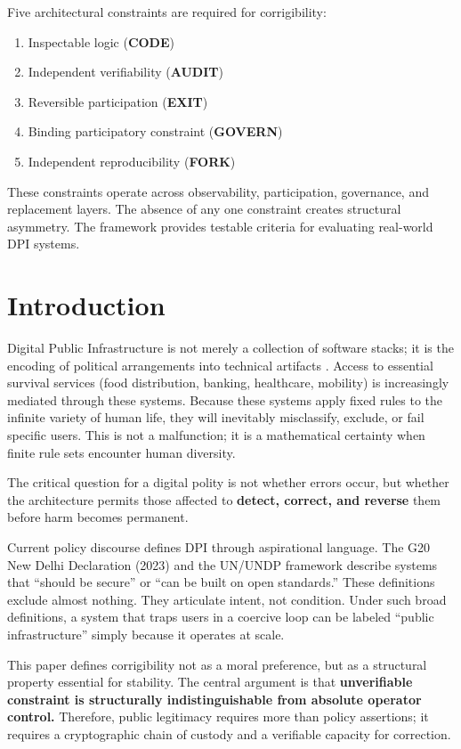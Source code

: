 \documentclass{article}
\begin{document}
Five architectural constraints are required for corrigibility:

\begin{enumerate}[noitemsep]
    \item Inspectable logic (\textbf{CODE})
    \item Independent verifiability (\textbf{AUDIT})
    \item Reversible participation (\textbf{EXIT})
    \item Binding participatory constraint (\textbf{GOVERN})
    \item Independent reproducibility (\textbf{FORK})
\end{enumerate}

These constraints operate across observability, participation, governance, and replacement layers. The absence of any one constraint creates structural asymmetry. The framework provides testable criteria for evaluating real-world DPI systems.

\section{Introduction}

Digital Public Infrastructure is not merely a collection of software stacks; it is the encoding of political arrangements into technical artifacts \citep{winner1980}. Access to essential survival services (food distribution, banking, healthcare, mobility) is increasingly mediated through these systems. Because these systems apply fixed rules to the infinite variety of human life, they will inevitably misclassify, exclude, or fail specific users. This is not a malfunction; it is a mathematical certainty when finite rule sets encounter human diversity.

The critical question for a digital polity is not whether errors occur, but whether the architecture permits those affected to \textbf{detect, correct, and reverse} them before harm becomes permanent.

Current policy discourse defines DPI through aspirational language. The G20 New Delhi Declaration (2023) and the UN/UNDP framework \citep{undp} describe systems that ``should be secure'' or ``can be built on open standards.'' These definitions exclude almost nothing. They articulate intent, not condition. Under such broad definitions, a system that traps users in a coercive loop can be labeled ``public infrastructure'' simply because it operates at scale.

This paper defines corrigibility not as a moral preference, but as a structural property essential for stability. The central argument is that \textbf{unverifiable constraint is structurally indistinguishable from absolute operator control.} Therefore, public legitimacy requires more than policy assertions; it requires a cryptographic chain of custody and a verifiable capacity for correction.
\end{document}
